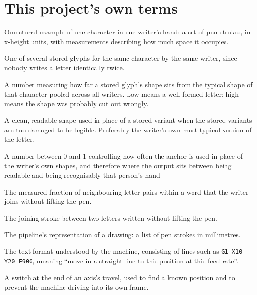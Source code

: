 \section{This project's own terms}
\begin{description}[style=nextline,leftmargin=1.4em]
  \item[Glyph] One stored example of one character in one writer's hand: a
        set of pen strokes, in x-height units, with measurements describing
        how much space it occupies.
  \item[Variant] One of several stored glyphs for the same character by the
        same writer, since nobody writes a letter identically twice.
  \item[Prior distance] A number measuring how far a stored glyph's shape
        sits from the typical shape of that character pooled across all
        writers. Low means a well-formed letter; high means the shape was
        probably cut out wrongly.
  \item[Anchor, or fallback letterform] A clean, readable shape used in place
        of a stored variant when the stored variants are too damaged to be
        legible. Preferably the writer's own most typical version of the
        letter.
  \item[Legibility lambda] A number between 0 and 1 controlling how often the
        anchor is used in place of the writer's own shapes, and therefore
        where the output sits between being readable and being recognisably
        that person's hand.
  \item[Connectedness] The measured fraction of neighbouring letter pairs
        within a word that the writer joins without lifting the pen.
  \item[Ligature] The joining stroke between two letters written without
        lifting the pen.
  \item[Trajectory] The pipeline's representation of a drawing: a list of pen
        strokes in millimetres.
  \item[G-code] The text format understood by the machine, consisting of
        lines such as \texttt{G1 X10 Y20 F900}, meaning ``move in a straight
        line to this position at this feed rate''.
  \item[Endstop] A switch at the end of an axis's travel, used to find a
        known position and to prevent the machine driving into its own
        frame.
\end{description}

